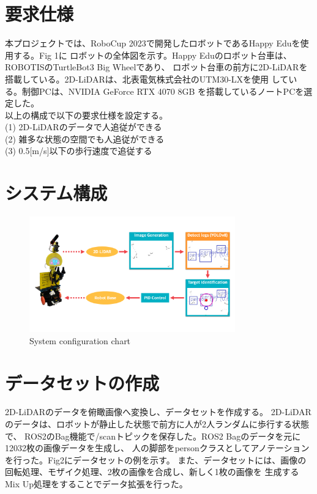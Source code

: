 \section{要求仕様}
本プロジェクトでは、RoboCup 2023で開発したロボットであるHappy Eduを使用する。Fig 1に
ロボットの全体図を示す。Happy Eduのロボット台車は、ROBOTISのTurtleBot3 Big Wheelであり、
ロボット台車の前方に2D-LiDARを搭載している。2D-LiDARは、北表電気株式会社のUTM30-LXを使用
している。制御PCは、NVIDIA GeForce RTX 4070 8GB を搭載しているノートPCを選定した。\\ \indent
以上の構成で以下の要求仕様を設定する。\\
(1) 2D-LiDARのデータで人追従ができる \\
(2) 雑多な状態の空間でも人追従ができる \\
(3) 0.5[m/s]以下の歩行速度で追従する \\

\section{システム構成}
\begin{figure}[h]
    \begin{center}
    \includegraphics[height=50mm,clip]{figure/システム構成図.png}
    \caption{System configuration chart}
    \label{System configuration chart}
    \end{center}
  \end{figure}

\section{データセットの作成}
2D-LiDARのデータを俯瞰画像へ変換し、データセットを作成する。
2D-LiDAR のデータは、ロボットが静止した状態で前方に人が2人ランダムに歩行する状態で、
ROS2のBag機能で/scanトピックを保存した。ROS2 Bagのデータを元に12032枚の画像データを生成し、
人の脚部をpersonクラスとしてアノテーションを行った。Fig2にデータセットの例を示す。
また、データセットには、画像の回転処理、モザイク処理、2枚の画像を合成し、新しく1枚の画像を
生成するMix Up処理をすることでデータ拡張を行った。


